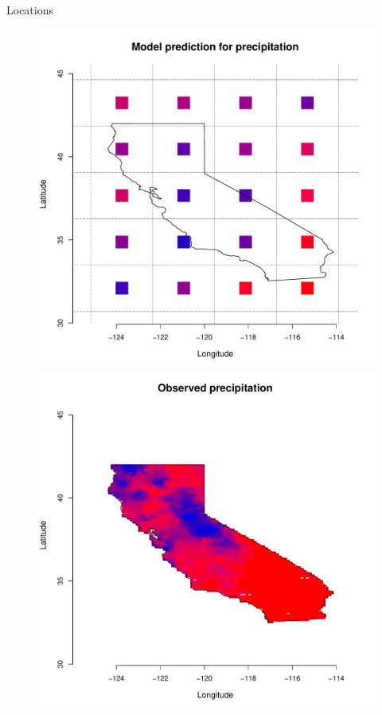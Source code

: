 \documentclass[mathserif, 11pt, t]{beamer}
\begin{document}
\begin{frame}{Locations}

\begin{figure}
\begin{center}
\includegraphics[scale=0.18]{figs/cal_mod_box1.pdf}
\includegraphics[scale=0.18]{figs/cal_mod_box2.pdf}

\end{center}
\end{figure}
\end{frame}
\end{document}
